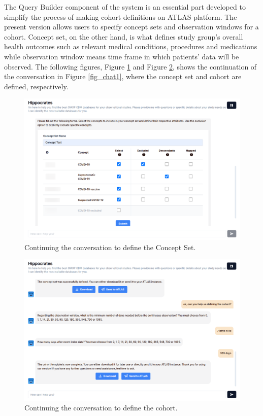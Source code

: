 The Query Builder component of the system is an essential part developed to simplify the process of making cohort definitions on ATLAS platform. The present version allows users to specify concept sets and observation windows for a cohort. Concept set, on the other hand, is what defines study group's overall health outcomes such as relevant medical conditions, procedures and medications while observation window means time frame in which patients' data will be observed. The following figures, Figure \ref{fig_chat2} and Figure \ref{fig_chat3}, shows the continuation of the conversation in Figure \ref{fig_chat1}, where the concept set and cohort are defined, respectively.

\begin{figure}[H]
    \includegraphics[width=\textwidth]{figs/chapter5/chat2_blur.png}
    \centering
    \caption{Continuing the conversation to define the Concept Set.}
    \label{fig_chat2}
\end{figure}

\begin{figure}[H]
    \includegraphics[width=\textwidth]{figs/chapter5/chat3.png}
    \centering
    \caption{Continuing the conversation to define the cohort.}
    \label{fig_chat3}
\end{figure}


